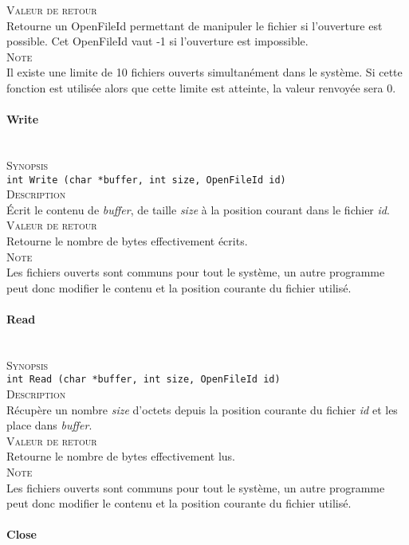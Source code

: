 \documentclass{report}
\newcommand{\myparagraph}[1]{\paragraph*{#1}\mbox{}\\}
\begin{document}
\textsc{Valeur de retour}\\
	Retourne un OpenFileId permettant de manipuler le fichier si l'ouverture est possible. Cet OpenFileId vaut -1 si l'ouverture est impossible.\\	

\textsc{Note}\\
	Il existe une limite de 10 fichiers ouverts simultanément dans le système. Si cette fonction est utilisée alors que cette limite est atteinte, la valeur renvoyée sera 0.\\
\myparagraph{Write}

\textsc{Synopsis}\\	
	\texttt{int Write (char *buffer, int size, OpenFileId id)}\\
	
\textsc{Description}\\
	Écrit le contenu de \textit{buffer}, de taille \textit{size} à la position courant dans le fichier \textit{id}.  \\	

\textsc{Valeur de retour}\\
	Retourne le nombre de bytes effectivement écrits.\\	

\textsc{Note}\\
	Les fichiers ouverts sont communs pour tout le système, un autre programme peut donc modifier le contenu et la position courante du fichier utilisé.\\	
\myparagraph{Read}

\textsc{Synopsis}\\	
	\texttt{int Read (char *buffer, int size, OpenFileId id)}\\
	
\textsc{Description}\\
	Récupère un nombre \textit{size} d'octets depuis la position courante du fichier \textit{id} et les place dans \textit{buffer}.  \\	

\textsc{Valeur de retour}\\
	Retourne le nombre de bytes effectivement lus.\\
	
\textsc{Note}\\
	Les fichiers ouverts sont communs pour tout le système, un autre programme peut donc modifier le contenu et la position courante du fichier utilisé.\\	
\myparagraph{Close}
\end{document}
